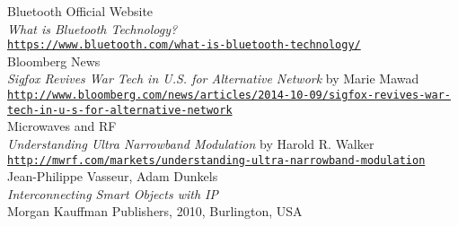 \begin{thebibliography}{}
 Bluetooth Official Website\\
  \emph{What is Bluetooth Technology?} \\
  \footnotesize \texttt{\url{https://www.bluetooth.com/what-is-bluetooth-technology/}} \\
  
 Bloomberg News \\
  \emph{Sigfox Revives War Tech in U.S. for Alternative Network} by Marie Mawad \\
  \footnotesize \texttt{\url{http://www.bloomberg.com/news/articles/2014-10-09/sigfox-revives-war-tech-in-u-s-for-alternative-network}} \\
  
 Microwaves and RF\\
  \emph{Understanding Ultra Narrowband Modulation} by Harold R. Walker \\
  \footnotesize \texttt{\url{http://mwrf.com/markets/understanding-ultra-narrowband-modulation}} \\
  
 Jean-Philippe Vasseur, Adam Dunkels\\
  \emph{Interconnecting Smart Objects with IP} \\
  \footnotesize Morgan Kauffman Publishers, 2010, Burlington, USA \\
  
\end{thebibliography}
